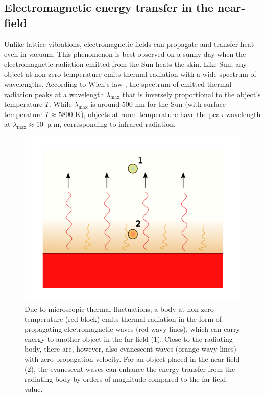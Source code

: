 \subsection{Electromagnetic energy transfer in the near-field}
\label{sec:intro_em}

Unlike lattice vibrations, electromagnetic fields can propagate and transfer heat even in vacuum. This phenomenon is best observed on a sunny day when the electromagnetic radiation emitted from the Sun heats the skin. Like Sun, any object at non-zero temperature emits thermal radiation with a wide spectrum of wavelengths. According to Wien's law \cite{modest}, the spectrum of emitted thermal radiation peaks at a wavelength $\lambda_{\textrm{max}}$ that is inversely proportional to the object's temperature $T$. While $\lambda_{\textrm{max}}$ is around 500 nm for the Sun (with surface temperature $T\approx 5800$ K), objects at room temperature have the peak wavelength at $\lambda_{\textrm{max}}\approx 10$ $\upmu$m, corresponding to infrared radiation. 

\begin{figure}
\begin{center}
 \includegraphics[width=.80\columnwidth]{inkscape/thermal_radiation.pdf}
 \caption{Due to microscopic thermal fluctuations, a body at non-zero temperature (red block) emits thermal radiation in the form of propagating electromagnetic waves (red wavy lines), which can carry energy to another object in the far-field (1). Close to the radiating body, there are, however, also evanescent waves (orange wavy lines) with zero propagation velocity. For an object placed in the near-field (2), the evanescent waves can enhance the energy transfer from the radiating body by orders of magnitude compared to the far-field value.}
\label{fig:intro_em}
\end{center}
\end{figure}

